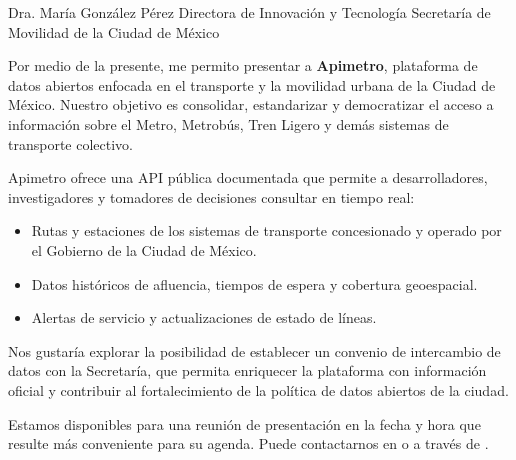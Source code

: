 
\DatosDestinatario
  {Dra. María González Pérez}
  {Directora de Innovación y Tecnología}
  {Secretaría de Movilidad de la Ciudad de México}



Por medio de la presente, me permito presentar a \textbf{Apimetro}, plataforma
de datos abiertos enfocada en el transporte y la movilidad urbana de la Ciudad
de México. Nuestro objetivo es consolidar, estandarizar y democratizar el acceso
a información sobre el Metro, Metrobús, Tren Ligero y demás sistemas de
transporte colectivo.


Apimetro ofrece una API pública documentada que permite a desarrolladores,
investigadores y tomadores de decisiones consultar en tiempo real:

\begin{itemize}[leftmargin=1.5em]
  \item Rutas y estaciones de los sistemas de transporte concesionado y
        operado por el Gobierno de la Ciudad de México.
  \item Datos históricos de afluencia, tiempos de espera y cobertura
        geoespacial.
  \item Alertas de servicio y actualizaciones de estado de líneas.
\end{itemize}


Nos gustaría explorar la posibilidad de establecer un convenio de intercambio
de datos con la Secretaría, que permita enriquecer la plataforma con
información oficial y contribuir al fortalecimiento de la política de datos
abiertos de la ciudad.

Estamos disponibles para una reunión de presentación en la fecha y hora que
resulte más conveniente para su agenda. Puede contactarnos en
\href{mailto:\ContactoEmail}{\ContactoEmail} o a través de
\href{https://\ContactoWeb}{\ContactoWeb}.

\FirmaBloque{\FirmanteName}{\FirmanteCargo}

